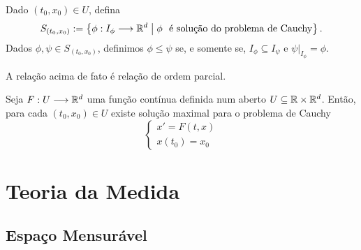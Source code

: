 \begin{defi}
	Dado $(t_0,x_0) \in U$, defina
	\begin{equation*}
	S_{(t_0,x_0)} := \left\{\phi: I_\phi \longrightarrow \mathbb{R}^d \;\middle\vert\; \phi \text{\ \ é solução do problema de Cauchy} \right\}.
	\end{equation*}
Dados $\phi ,\psi \in S_{(t_0,x_0)}$, definimos $\phi \leq \psi $ se, e somente se, $I_{\phi } \subseteq I_{\psi}$ e $\psi|_{I_\phi} = \phi $.
\end{defi}

\begin{prop}
	A relação acima de fato é relação de ordem parcial.
\end{prop}

\begin{teo}
	Seja $F: U \longrightarrow \mathbb{R}^d$ uma função contínua definida num aberto $U \subseteq \mathbb{R} \times \mathbb{R}^d$. Então, para cada $(t_0,x_0) \in U$ existe solução maximal para o problema de Cauchy
	\begin{equation*}
	\begin{cases}
		x' = F(t,x) \\
		x(t_0)=x_0
	\end{cases}
	\end{equation*}
\end{teo}









































\chapter{Teoria da Medida}

\section{Espaço Mensurável}

